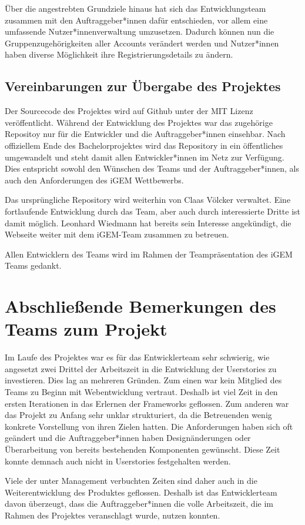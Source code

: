 \documentclass[accentcolor=tud0b,12pt,paper=a4]{tudreport}
\begin{document}
	Über die angestrebten Grundziele hinaus hat sich das Entwicklungsteam zusammen mit den Auftraggeber*innen dafür entschieden, vor allem eine umfassende Nutzer*innenverwaltung umzusetzen. Dadurch können nun die Gruppenzugehörigkeiten aller Accounts verändert werden und Nutzer*innen haben diverse Möglichkeit ihre Registrierungsdetails zu ändern.

	\section{Vereinbarungen zur Übergabe des Projektes}
	Der Sourcecode des Projektes wird auf Github unter der MIT Lizenz veröffentlicht. Während der Entwicklung des Projektes war das zugehörige Repositoy nur für die Entwickler und die Auftraggeber*innen einsehbar. Nach offiziellem Ende des Bachelorprojektes wird das Repository in ein öffentliches umgewandelt und steht damit allen Entwickler*innen im Netz zur Verfügung. Dies entspricht sowohl den Wünschen des Teams und der Auftraggeber*innen, als auch den Anforderungen des iGEM Wettbewerbs.

	Das ursprüngliche Repository wird weiterhin von Claas Völcker verwaltet. Eine fortlaufende Entwicklung durch das Team, aber auch durch interessierte Dritte ist damit möglich. Leonhard Wiedmann hat bereits sein Interesse angekündigt, die Webseite weiter mit dem iGEM-Team zusammen zu betreuen.

	Allen Entwicklern des Teams wird im Rahmen der Teampräsentation des iGEM Teams gedankt.


\chapter{Abschließende Bemerkungen des Teams zum Projekt}
	Im Laufe des Projektes war es für das Entwicklerteam sehr schwierig, wie angesetzt zwei Drittel der Arbeitszeit in die Entwicklung der Userstories zu investieren. Dies lag an mehreren Gründen. Zum einen war kein Mitglied des Teams zu Beginn mit Webentwicklung vertraut. Deshalb ist viel Zeit in den ersten Iterationen in das Erlernen der Frameworks geflossen. Zum anderen war das Projekt zu Anfang sehr unklar strukturiert, da die Betreuenden wenig konkrete Vorstellung von ihren Zielen hatten. Die Anforderungen haben sich oft geändert und die Auftraggeber*innen haben Designänderungen oder Überarbeitung von bereits bestehenden Komponenten gewünscht. Diese Zeit konnte demnach auch nicht in Userstories festgehalten werden.
		
	Viele der unter Management verbuchten Zeiten sind daher auch in die Weiterentwicklung des Produktes geflossen. Deshalb ist das Entwicklerteam davon überzeugt, dass die Auftraggeber*innen die volle Arbeitszeit, die im Rahmen des Projektes veranschlagt wurde, nutzen konnten. 
	
\end{document}
